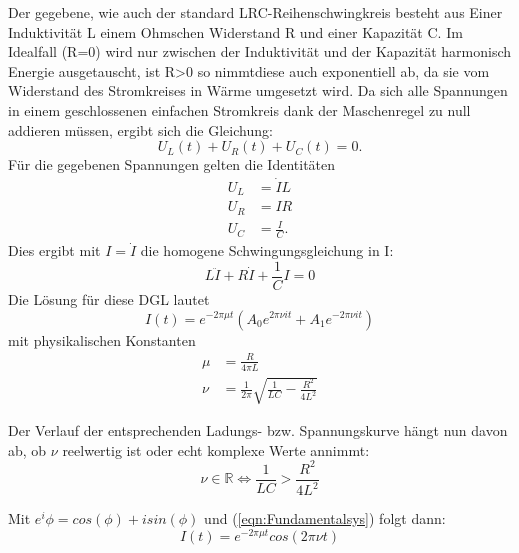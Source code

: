   Der gegebene, wie auch der standard LRC-Reihenschwingkreis besteht aus Einer Induktivität L einem Ohmschen Widerstand R und einer Kapazität C.
   Im Idealfall (R=0) wird nur zwischen der Induktivität und der Kapazität harmonisch Energie ausgetauscht, ist R>0 so nimmtdiese auch exponentiell ab,
   da sie vom Widerstand des Stromkreises in Wärme umgesetzt wird.
       Da sich alle Spannungen in einem geschlossenen einfachen Stromkreis dank der Maschenregel zu null addieren müssen,
   ergibt sich die Gleichung:
       \begin{equation}
           U_L(t)+U_R(t)+U_C(t)=0.
           \label{eqn:Krichhoff2}
       \end{equation}
       Für die gegebenen Spannungen gelten die Identitäten
       \begin{align*}
           U_L &= \dot{I}L \\
           U_R &= IR  \\
           U_C &= \frac{I}{C}.
       \end{align*}
       Dies ergibt mit $I=\dot{I}$ die homogene Schwingungsgleichung in I:
       \begin{equation}
           L\ddot{I}+R\dot{I}+\frac{1}{C}I=0
           \label{eqn:Schwingungsgleichung}
       \end{equation}
       Die Lösung für diese DGL lautet
       \begin{equation}
           I(t)=e^{-2\pi\mu t}(A_0e^{2\pi\nu it}+A_1e^{-2\pi\nu it})
           \label{eqn:Fundamentalsys}
       \end{equation}
       mit physikalischen Konstanten
       \begin{align}
           \mu &= \frac{R}{4\pi L}\\
           \nu &= \frac{1}{2\pi}\sqrt{\frac{1}{LC}-\frac{R^2}{4L^2}}
       \end{align}

       Der Verlauf der entsprechenden Ladungs- bzw. Spannungskurve hängt nun davon ab,
       ob $\nu$ reelwertig ist oder echt komplexe Werte annimmt:
       \begin{equation*}
           \nu \in \mathbb{R} \iff \frac{1}{LC} > \frac{R^2}{4L^2}
       \end{equation*}

       Mit $e^i\phi= cos(\phi)+isin(\phi)$ und (\ref{eqn:Fundamentalsys}) folgt dann:
       \begin{equation}
           I(t) = e^{-2\pi\mu t}cos(2\pi\nu t)
       \end{equation}

